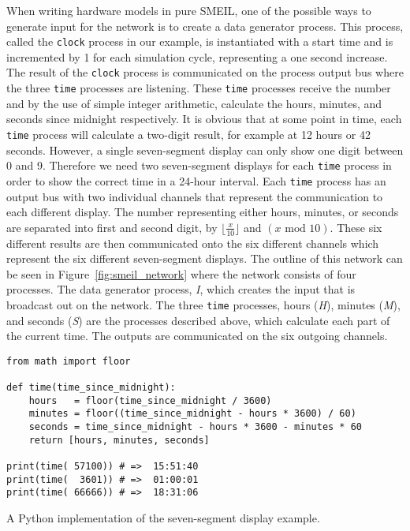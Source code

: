 When writing hardware models in pure SMEIL, one of the possible ways to generate input for the network is to create a data generator process. This process, called the \texttt{clock} process in our example, is instantiated with a start time and is incremented by 1 for each simulation cycle, representing a one second increase. The result of the \texttt{clock} process is communicated on the process output bus where the three \texttt{time} processes are listening. These \texttt{time} processes receive the number and by the use of simple integer arithmetic, calculate the hours, minutes, and seconds since midnight respectively. It is obvious that at some point in time, each \texttt{time} process will calculate a two-digit result, for example at 12 hours or 42 seconds. However, a single seven-segment display can only show one digit between 0 and 9. Therefore we need two seven-segment displays for each \texttt{time} process in order to show the correct time in a 24-hour interval. Each \texttt{time} process has an output bus with two individual channels that represent the communication to each different display. The number representing either hours, minutes, or seconds are separated into first and second digit, by $\lfloor \frac{x}{10} \rfloor$ and $(x \text{ mod } 10)$. These six different results are then communicated onto the six different channels which represent the six different seven-segment displays. The outline of this network can be seen in Figure~\ref{fig:smeil_network} where the network consists of four processes. The data generator process, \textit{I}, which creates the input that is broadcast out on the network. The three \texttt{time} processes, hours (\textit{H}), minutes (\textit{M}), and seconds (\textit{S}) are the processes described above, which calculate each part of the current time. The outputs are communicated on the six outgoing channels.
\\
\begin{listing}
\begin{verbatim}
from math import floor

def time(time_since_midnight):
    hours   = floor(time_since_midnight / 3600)
    minutes = floor((time_since_midnight - hours * 3600) / 60)
    seconds = time_since_midnight - hours * 3600 - minutes * 60
    return [hours, minutes, seconds]

print(time( 57100)) # =>  15:51:40
print(time(  3601)) # =>  01:00:01
print(time( 66666)) # =>  18:31:06
\end{verbatim}
\caption{A Python implementation of the seven-segment display example.}
\label{lst:python}
\end{listing}
